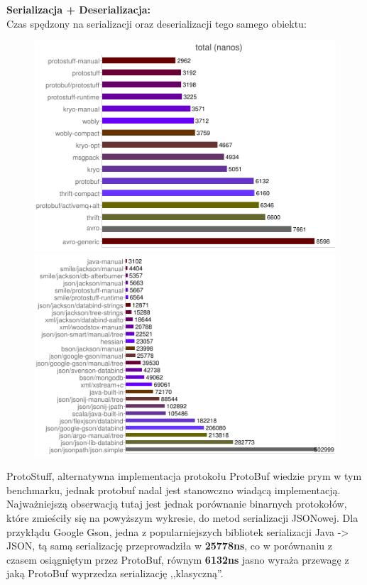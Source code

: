 \textbf{Serializacja + Deserializacja:}\\
Czas spędzony na serializacji oraz deserializacji tego samego obiektu:

\begin{figure}[ch!]
 \includegraphics[scale=0.8]{proto_1}
 \includegraphics[scale=1]{proto_2} 
\end{figure}

ProtoStuff, alternatywna implementacja protokołu ProtoBuf wiedzie prym w tym benchmarku, jednak protobuf nadal jest stanowczno wiadącą implementacją.
Najważniejszą obserwacją tutaj jest jednak porównanie binarnych protokołów, które zmieściły się na powyższym wykresie, do metod serializacji JSONowej.
Dla przykłądu Google Gson, jedna z popularniejszych bibliotek serializacji Java -> JSON, tą samą serializację przeprowadziła w \textbf{25778ns}, co w porównaniu
z czasem osiągniętym przez ProtoBuf, równym \textbf{6132ns} jasno wyraża przewagę z jaką ProtoBuf wyprzedza serializację ,,klasyczną''.

